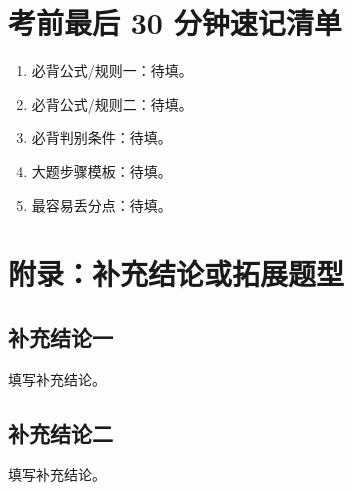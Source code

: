 \documentclass[UTF8,zihao=-4]{ctexart}
\begin{document}
\section{考前最后 30 分钟速记清单}

\begin{keybox}[最后 30 分钟只看这些]
\begin{enumerate}
  \item 必背公式/规则一：待填。
  \item 必背公式/规则二：待填。
  \item 必背判别条件：待填。
  \item 大题步骤模板：待填。
  \item 最容易丢分点：待填。
\end{enumerate}
\end{keybox}

\section{附录：补充结论或拓展题型}

\subsection{补充结论一}
填写补充结论。

\subsection{补充结论二}
填写补充结论。
\end{document}
